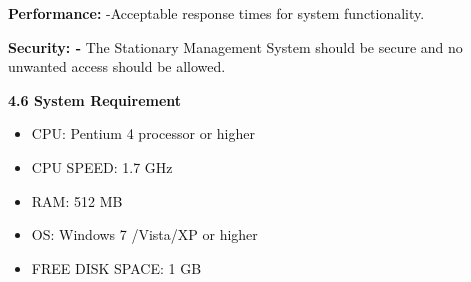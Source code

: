 \documentclass[12pt]{report}
\renewcommand{\_}{\kern-1.5pt\textunderscore\kern-1.5pt}
\begin{document}
\begin{adjustwidth}{0.2in}{0.84in}
\begin{justify}
\textbf{\textcolor[HTML]{0D0D0D}{Performance:}}\textcolor[HTML]{0D0D0D}{ -Acceptable response times for system functionality.}
\end{justify}\par

\end{adjustwidth}

\begin{adjustwidth}{0.2in}{0.84in}
\begin{justify}
\textcolor[HTML]{0D0D0D}{ }
\end{justify}\par

\end{adjustwidth}

\begin{adjustwidth}{0.2in}{0.84in}
\begin{justify}
\textbf{\textcolor[HTML]{0D0D0D}{Security: -}}\textcolor[HTML]{0D0D0D}{ The Stationary Management System should be secure and no unwanted access should be allowed.}
\end{justify}\par

\end{adjustwidth}


\vspace{\baselineskip}

\vspace{\baselineskip}
\begin{adjustwidth}{0.2in}{0.84in}
{\fontsize{14pt}{16.8pt}\selectfont \textbf{\textcolor[HTML]{0D0D0D}{4.6 System Requirement}}\par}\par

\end{adjustwidth}

\setlength{\parskip}{5.04pt}
\begin{itemize}
	\item \textcolor[HTML]{0D0D0D}{CPU: Pentium 4 processor or higher}\par

	\item \textcolor[HTML]{0D0D0D}{CPU SPEED: 1.7 GHz}\par

	\item \textcolor[HTML]{0D0D0D}{RAM: 512 MB}\par

	\item \textcolor[HTML]{0D0D0D}{OS: Windows 7 /Vista/XP or higher}\par

	\item \textcolor[HTML]{0D0D0D}{FREE DISK SPACE: 1 GB}
\end{itemize}\par
\end{document}

